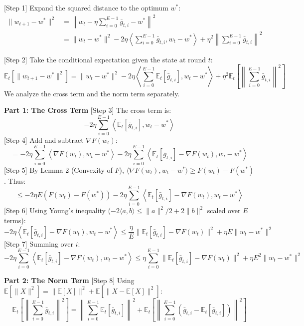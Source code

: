 \documentclass{article}
\begin{document}
[Step 1] Expand the squared distance to the optimum $w^*$:
\begin{align*}
\|w_{t+1} - w^*\|^2 &= \left\| w_t - \eta \sum_{i=0}^{E-1} \bar{g}_{t,i} - w^* \right\|^2 \\
&= \|w_t - w^*\|^2 - 2\eta \left\langle \sum_{i=0}^{E-1} \bar{g}_{t,i}, w_t - w^* \right\rangle + \eta^2 \left\| \sum_{i=0}^{E-1} \bar{g}_{t,i} \right\|^2
\end{align*}

[Step 2] Take the conditional expectation given the state at round $t$:
$$ \mathbb{E}_t[\|w_{t+1} - w^*\|^2] = \|w_t - w^*\|^2 - 2\eta \left\langle \sum_{i=0}^{E-1} \mathbb{E}_t[\bar{g}_{t,i}], w_t - w^* \right\rangle + \eta^2 \mathbb{E}_t\left[ \left\| \sum_{i=0}^{E-1} \bar{g}_{t,i} \right\|^2 \right] $$
We analyze the cross term and the norm term separately.

\textbf{Part 1: The Cross Term}
[Step 3] The cross term is:
$$ -2\eta \sum_{i=0}^{E-1} \left\langle \mathbb{E}_t[\bar{g}_{t,i}], w_t - w^* \right\rangle $$
[Step 4] Add and subtract $\nabla F(w_t)$:
$$ = -2\eta \sum_{i=0}^{E-1} \left\langle \nabla F(w_t), w_t - w^* \right\rangle - 2\eta \sum_{i=0}^{E-1} \left\langle \mathbb{E}_t[\bar{g}_{t,i}] - \nabla F(w_t), w_t - w^* \right\rangle $$
[Step 5] By Lemma 2 (Convexity of $F$), $\langle \nabla F(w_t), w_t - w^* \rangle \geq F(w_t) - F(w^*)$. Thus:
$$ \leq -2\eta E (F(w_t) - F(w^*)) - 2\eta \sum_{i=0}^{E-1} \left\langle \mathbb{E}_t[\bar{g}_{t,i}] - \nabla F(w_t), w_t - w^* \right\rangle $$
[Step 6] Using Young's inequality ($-2\langle a, b\rangle \leq \|a\|^2/2 + 2\|b\|^2$ scaled over $E$ terms):
$$ -2\eta \left\langle \mathbb{E}_t[\bar{g}_{t,i}] - \nabla F(w_t), w_t - w^* \right\rangle \leq \frac{\eta}{E} \|\mathbb{E}_t[\bar{g}_{t,i}] - \nabla F(w_t)\|^2 + \eta E \|w_t - w^*\|^2 $$
[Step 7] Summing over $i$:
$$ -2\eta \sum_{i=0}^{E-1} \left\langle \mathbb{E}_t[\bar{g}_{t,i}] - \nabla F(w_t), w_t - w^* \right\rangle \leq \eta \sum_{i=0}^{E-1} \|\mathbb{E}_t[\bar{g}_{t,i}] - \nabla F(w_t)\|^2 + \eta E^2 \|w_t - w^*\|^2 $$

\textbf{Part 2: The Norm Term}
[Step 8] Using $\mathbb{E}[\|X\|^2] = \|\mathbb{E}[X]\|^2 + \mathbb{E}[\|X - \mathbb{E}[X]\|^2]$:
$$ \mathbb{E}_t\left[ \left\| \sum_{i=0}^{E-1} \bar{g}_{t,i} \right\|^2 \right] = \left\| \sum_{i=0}^{E-1} \mathbb{E}_t[\bar{g}_{t,i}] \right\|^2 + \mathbb{E}_t\left[ \left\| \sum_{i=0}^{E-1} \left( \bar{g}_{t,i} - \mathbb{E}_t[\bar{g}_{t,i}] \right) \right\|^2 \right] $$
\end{document}
